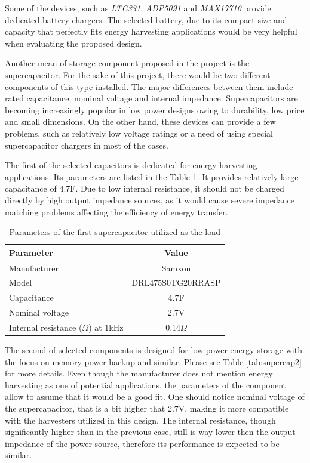 \documentclass[12pt,a4paper]{article}
\begin{document}
Some of the devices, such as \textit{LTC331}, \textit{ADP5091} and \textit{MAX17710} provide dedicated battery chargers. The selected battery, due to its compact size and capacity that perfectly fits energy harvesting applications would be very helpful when evaluating the proposed design.
\par
Another mean of storage component proposed in the project is the supercapacitor. For the sake of this project, there would be two different components of this type installed. The major differences between them include rated capacitance, nominal voltage and internal impedance. Supercapacitors are becoming increasingly popular in low power designs owing to durability, low price and small dimensions. On the other hand, these devices can provide a few problems, such as relatively low voltage ratings or a need of using special supercapacitor chargers in most of the cases.
\par

The first of the selected capacitors is dedicated for energy harvesting applications. Its parameters are listed in the Table \ref{tab:supercap1}. It provides relatively large capacitance of 4.7F. Due to low internal resistance, it should not be charged directly by high output impedance sources, as it would cause severe impedance matching problems affecting the efficiency of energy transfer.

\begin{table}[ht!]
\begin{tabular}{|l|c|}
\hline
\textbf{Parameter}              & \textbf{Value} \\ \hline
Manufacturer & Samxon          \\ \hline
Model                 & DRL475S0TG20RRASP \\ \hline
Capacitance                & 4.7F         \\ \hline
Nominal voltage     & 2.7V           \\ \hline
Internal resistance ($\Omega$) at 1kHz     & 0.14$\Omega$ \\ \hline
\end{tabular}
\caption{Parameters of the first supercapacitor utilized as the load \cite{supercap2params} }
\label{tab:supercap1}
\end{table}
\par
The second of selected components is designed for low power energy storage with the focus on memory power backup and similar. Please see Table \ref{tab:supercap2} for more details. Even though the manufacturer does not mention energy harvesting as one of potential applications, the parameters of the component allow to assume that it would be a good fit. One should notice nominal voltage of the supercapacitor, that is a bit higher that 2.7V, making it more compatible with the harvesters utilized in this design. The internal resistance, though significantly higher than in the previous case, still is way lower then the output impedance of the power source, therefore its performance is expected to be similar. 
\end{document}
